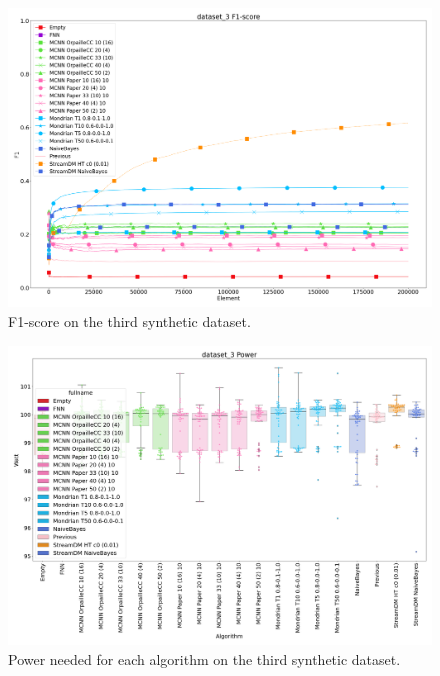 \begin{figure}[H]
	\includegraphics[width=\linewidth]{figures/results/dataset_3_f1.png}
	\caption{F1-score on the third synthetic dataset.}
\end{figure}
\begin{figure}[H]
	\includegraphics[width=\linewidth]{figures/results/dataset_3_watt.png}
	\caption{Power needed for each algorithm on the third synthetic dataset.}
\end{figure}
